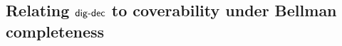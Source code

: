 
    





\subsection{Relating $\mathsf{dig}\text{-}\mathsf{dec}$ to coverability under Bellman completeness}\label{app: coverability hybrid}

    

